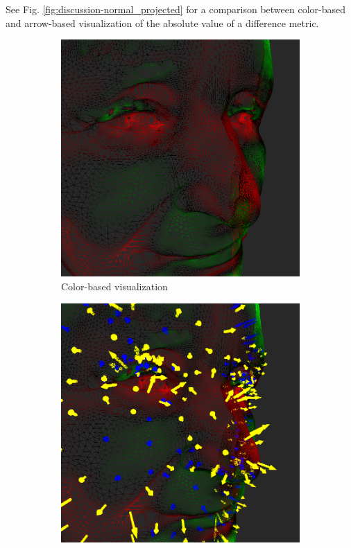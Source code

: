 See Fig. \ref{fig:discussion-normal_projected} for a comparison between color-based and arrow-based visualization of the absolute value of a difference metric.

\begin{figure}[h]
	\centering
	\begin{subfigure}{0.4\textwidth}
		\includegraphics[width=\textwidth]{./img/normal_projected_vis-color.PNG}
		\caption{Color-based visualization}
		\label{fig:meshlab_example}
	\end{subfigure}
	\qquad
	\begin{subfigure}{0.4\textwidth}
		\includegraphics[width=\textwidth]{./img/normal_projected_vis-arrows.PNG}

\end{subfigure}
\end{figure}
